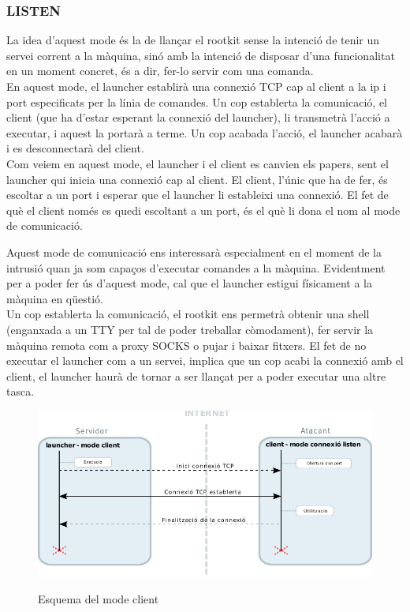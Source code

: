 \subsubsection{LISTEN}
La idea d'aquest mode és la de llançar el rootkit sense la intenció de tenir un servei corrent
a la màquina, sinó amb la intenció de disposar d'una funcionalitat en un moment concret, és a dir, fer-lo servir
com una comanda.\\

En aquest mode, el launcher establirà una connexió TCP cap al client a la ip i port especificats per la línia
de comandes. Un cop establerta la comunicació, el client (que ha d'estar esperant la connexió del launcher), 
li transmetrà l'acció a executar, i aquest la portarà a terme. Un cop acabada l'acció, el launcher acabarà
i es desconnectarà del client. \\

Com veiem en aquest mode, el launcher i el client es canvien els papers, sent el launcher qui inicia una connexió 
cap al client. El client, l'únic que ha de fer, és escoltar a un port i esperar que el launcher li estableixi
una connexió. El fet de què el client només es quedi escoltant a un port, és el què li dona el nom al mode de
comunicació.

Aquest mode de comunicació ens interessarà especialment en el moment de la intrusió quan ja som capaços d'executar
comandes a la màquina. Evidentment per a poder fer ús d'aquest mode, cal que el launcher estigui físicament
a la màquina en qüestió. \\

Un cop establerta la comunicació, el rootkit ens permetrà obtenir una shell (enganxada a un TTY per tal de poder treballar 
còmodament), fer servir la màquina remota com a proxy SOCKS o pujar i baixar fitxers. El fet de no executar el 
launcher com a un servei, implica que un cop acabi la connexió amb el client, el launcher haurà de tornar a ser llançat 
per a poder executar una altre tasca. \\

\begin{figure}[htp]
    \centering
    \includegraphics[scale=1.2,keepaspectratio]{diagrames/solutionDesignClientMode.pdf} \\
    \caption{Esquema del mode client}
    \label{fig:modeClient}
\end{figure}

